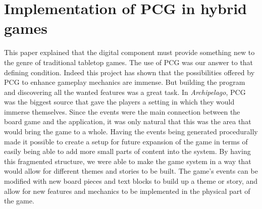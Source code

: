 \section{Implementation of PCG in hybrid games}
This paper explained that the digital component must provide something new to the genre of traditional tabletop games. The use of PCG was our answer to that defining condition. Indeed this project has shown that the possibilities offered by PCG to enhance gameplay mechanics are immense. But building the program and discovering all the wanted features was a great task. In \textit{Archipelago}, PCG was the biggest source that gave the players a setting in which they would immerse themselves. Since the events were the main connection between the board game and the application, it was only natural that this was the area that would bring the game to a whole. Having the events being generated procedurally made it possible to create a setup for future expansion of the game in terms of easily being able to add more small parts of content into the system. By having this fragmented structure, we were able to make the game system in a way that would allow for different themes and stories to be built. The game's events can be modified with new board pieces and text blocks to build up a theme or story, and allow for new features and mechanics to be implemented in the physical part of the game.

